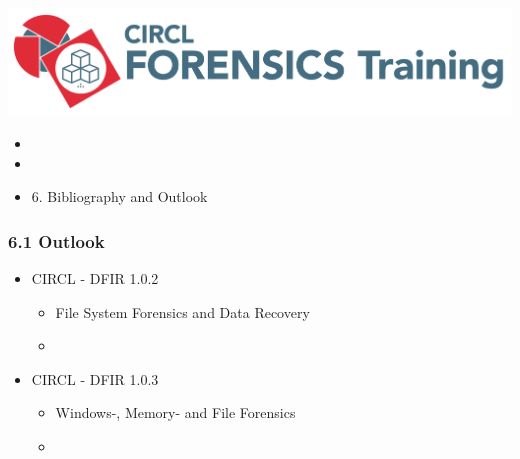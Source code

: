 %
%



\begin{frame}
    \includegraphics[scale=0.3]{images/logo-circl-Forensics.png}
    \begin{itemize}
        \item[]
        \item[]
        \item[] 6. Bibliography and Outlook
    \end{itemize}
\end{frame}


\begin{frame}
  \frametitle{6.1 Outlook}
  \begin{itemize}
      \item[] CIRCL - DFIR 1.0.2
      \begin{itemize}
          \item[] File System Forensics and Data Recovery
          \item[]
      \end{itemize}
      \item[] CIRCL - DFIR 1.0.3
      \begin{itemize}
          \item[] Windows-, Memory- and File Forensics
          \item[]
      \end{itemize}
  \end{itemize}
\end{frame}


